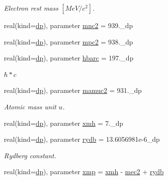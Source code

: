 \begin{DoxyCompactItemize}
\begin{DoxyCompactList}\small\item\em Electron rest mass $[MeV/c^2]$. \end{DoxyCompactList}\item 
real(kind=\mbox{\hyperlink{namespaceparameters_a52f8c6351fd79345d8811e065bcbbb37}{dp}}), parameter \mbox{\hyperlink{group__CONSTANTS_ga3cd51d33e13930045ff98294b5044e2c}{mnc2}} = 939.\+\_\+dp
\item 
real(kind=\mbox{\hyperlink{namespaceparameters_a52f8c6351fd79345d8811e065bcbbb37}{dp}}), parameter \mbox{\hyperlink{group__CONSTANTS_ga2e354d662a28a3a09a9819c54f818dab}{mpc2}} = 938.\+\_\+dp
\item 
real(kind=\mbox{\hyperlink{namespaceparameters_a52f8c6351fd79345d8811e065bcbbb37}{dp}}), parameter \mbox{\hyperlink{group__CONSTANTS_gafb47622609b676d956b2c58f4b909064}{hbarc}} = 197.\+\_\+dp
\begin{DoxyCompactList}\small\item\em $\hbar*c$ \end{DoxyCompactList}\item 
real(kind=\mbox{\hyperlink{namespaceparameters_a52f8c6351fd79345d8811e065bcbbb37}{dp}}), parameter \mbox{\hyperlink{group__HBAR2__2M_gaa00326a999bcae07e22d89387404ac19}{mamuc2}} = 931.\+\_\+dp
\begin{DoxyCompactList}\small\item\em Atomic mass unit $u$. \end{DoxyCompactList}\item 
real(kind=\mbox{\hyperlink{namespaceparameters_a52f8c6351fd79345d8811e065bcbbb37}{dp}}), parameter \mbox{\hyperlink{group__HBAR2__2M_gaad7518fe64b61c89a5fdca4244b22af1}{xmh}} = 7.\+\_\+dp
\item 
real(kind=\mbox{\hyperlink{namespaceparameters_a52f8c6351fd79345d8811e065bcbbb37}{dp}}), parameter \mbox{\hyperlink{group__HBAR2__2M_ga1ee1de4838adf9dd601aa5c6d518709c}{rydb}} = 13.\+6056981e-\/6\+\_\+dp
\begin{DoxyCompactList}\small\item\em Rydberg constant. \end{DoxyCompactList}\item 
real(kind=\mbox{\hyperlink{namespaceparameters_a52f8c6351fd79345d8811e065bcbbb37}{dp}}), parameter \mbox{\hyperlink{group__HBAR2__2M_gaca637757baec6d59dc2b73dcf21b6b3d}{xmp}} = \mbox{\hyperlink{group__HBAR2__2M_gaad7518fe64b61c89a5fdca4244b22af1}{xmh}} -\/ \mbox{\hyperlink{group__CONSTANTS_ga8b91e60e1e7c4b066cc282415c740bc9}{mec2}} + \mbox{\hyperlink{group__HBAR2__2M_ga1ee1de4838adf9dd601aa5c6d518709c}{rydb}}

\end{DoxyCompactItemize}

